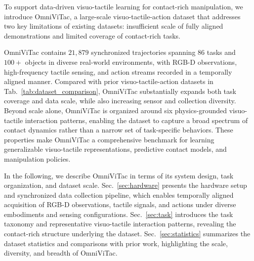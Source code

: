 To support data-driven visuo-tactile learning for contact-rich manipulation, we introduce {OmniViTac}, a large-scale visuo-tactile-action dataset that addresses two key limitations of existing datasets: insufficient scale of fully aligned demonstrations and limited coverage of contact-rich tasks.

OmniViTac contains $21,879$ synchronized trajectories spanning $86$ tasks and $100+$ objects in diverse real-world environments, with RGB-D observations, high-frequency tactile sensing, and action streams recorded in a temporally aligned manner. 
Compared with prior visuo-tactile-action datasets in Tab.~\ref{tab:dataset_comparison}, OmniViTac substantially expands both task coverage and data scale, while also increasing sensor and collection diversity. Beyond scale alone, OmniViTac is organized around six physics-grounded visuo-tactile interaction patterns, enabling the dataset to capture a broad spectrum of contact dynamics rather than a narrow set of task-specific behaviors. 
These properties make OmniViTac a comprehensive benchmark for learning generalizable visuo-tactile representations, predictive contact models, and manipulation policies.

In the following, we describe OmniViTac in terms of its system design, task organization, and dataset scale. 
Sec.~\ref{sec:hardware} presents the hardware setup and synchronized data collection pipeline, which enables temporally aligned acquisition of RGB-D observations, tactile signals, and actions under diverse embodiments and sensing configurations. 
Sec.~\ref{sec:task} introduces the task taxonomy and representative visuo-tactile interaction patterns, revealing the contact-rich structure underlying the dataset. 
Sec.~\ref{sec:statistics} summarizes the dataset statistics and comparisons with prior work, highlighting the scale, diversity, and breadth of OmniViTac.


